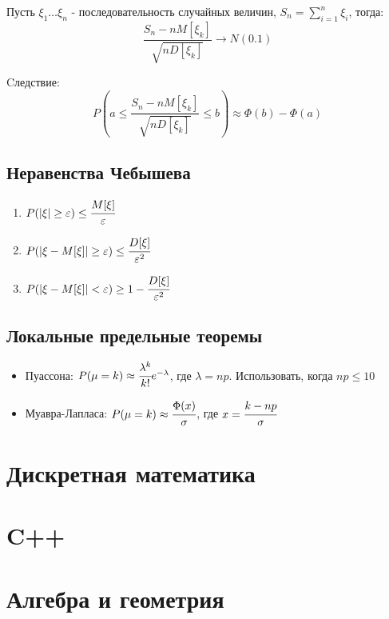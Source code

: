 Пусть $\xi_1 \dots \xi_n$ - последовательность случайных величин, $S_n = \sum_{i=1}^n \xi_i$, тогда:
\begin{equation}
	\frac{S_n-nM[\xi_k]}{\sqrt{nD[\xi_k]}} \rightarrow N(0.1)
\end{equation}

Cледствие:
\begin{equation}
	P(a \leq \frac{S_n-nM[\xi_k]}{\sqrt{nD[\xi_k]}} \leq b) \approx \Phi(b) - \Phi(a)
\end{equation}

\subsection{Неравенства Чебышева}
\begin{enumerate}
	\item $P(|\xi| \ge \varepsilon) \le \cfrac{M[\xi]}{\varepsilon}$ 
	\item $P(|\xi - M[\xi]| \ge \varepsilon) \le \cfrac{D[\xi]}{\varepsilon^2}$
	\item $P(|\xi - M[\xi]| < \varepsilon) \ge 1 - \cfrac{D[\xi]}{\varepsilon^2}$
\end{enumerate}


\subsection{Локальные предельные теоремы}
\begin{itemize}
	\item Пуассона: $P(\mu = k) \approx \cfrac{\lambda^k}{k!}e^{-\lambda}$, где $\lambda = np$. Использовать, когда $np \le 10$
	\item Муавра-Лапласа: $P(\mu = k)\approx \cfrac{\Phi(x)}{\sigma}$, где $x = \cfrac{k-np}{\sigma}$
\end{itemize}
\section{Дискретная математика}

\section{C++}
\section{Алгебра и геометрия}
